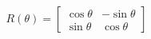 \documentclass[preview]{standalone}
\begin{document}
\begin{align*}
R(\theta) = \begin{bmatrix} \cos \theta & -\sin \theta \\ \sin \theta & \cos \theta \end{bmatrix}
\end{align*}
\end{document}
